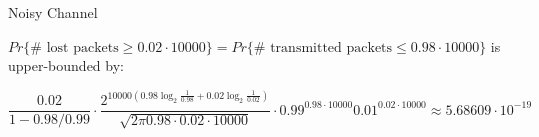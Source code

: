 \documentclass[../main.tex]{subfiles}
\begin{document}
\begin{questions}
\begin{parts}
  \end{parts}

  \question Noisy Channel
  \begin{solution}
    $Pr\{\# \text{ lost packets} \ge 0.02 \cdot 10000\} = Pr\{\# \text{ transmitted packets} \le 0.98 \cdot 10000\}$ is upper-bounded by:

    $$
    \frac{0.02}{1 - 0.98/0.99} \cdot \frac{2^{10000(0.98 \log_2 \frac{1}{0.98} + 0.02 \log_2 \frac{1}{0.02})}}{\sqrt{2 \pi 0.98 \cdot 0.02 \cdot 10000}} \cdot 0.99^{0.98 \cdot 10000}0.01^{0.02 \cdot 10000} \approx 5.68609 \cdot 10^{-19}
    $$
  \end{solution}

\end{questions}
\end{document}
